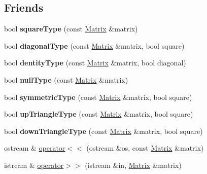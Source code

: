 \subsection*{Friends}
\begin{DoxyCompactItemize}
\item 
\hypertarget{class_matrix_ac308d2d0cd1651df117cd293f4a062ec}{bool {\bfseries square\-Type} (const \hyperlink{class_matrix}{Matrix} \&matrix)}\label{class_matrix_ac308d2d0cd1651df117cd293f4a062ec}

\item 
\hypertarget{class_matrix_a8f168d2d101b11060ff7665b718dbd00}{bool {\bfseries diagonal\-Type} (const \hyperlink{class_matrix}{Matrix} \&matrix, bool square)}\label{class_matrix_a8f168d2d101b11060ff7665b718dbd00}

\item 
\hypertarget{class_matrix_a0fe53702f523992357b0045647d86add}{bool {\bfseries dentity\-Type} (const \hyperlink{class_matrix}{Matrix} \&matrix, bool diagonal)}\label{class_matrix_a0fe53702f523992357b0045647d86add}

\item 
\hypertarget{class_matrix_ad324d8057612009e306716ff6f944d8d}{bool {\bfseries null\-Type} (const \hyperlink{class_matrix}{Matrix} \&matrix)}\label{class_matrix_ad324d8057612009e306716ff6f944d8d}

\item 
\hypertarget{class_matrix_a6952b686de4d766d5e6071ea05ce1e5e}{bool {\bfseries symmetric\-Type} (const \hyperlink{class_matrix}{Matrix} \&matrix, bool square)}\label{class_matrix_a6952b686de4d766d5e6071ea05ce1e5e}

\item 
\hypertarget{class_matrix_add887b389e9c6a532fd0de569ded15e1}{bool {\bfseries up\-Triangle\-Type} (const \hyperlink{class_matrix}{Matrix} \&matrix, bool square)}\label{class_matrix_add887b389e9c6a532fd0de569ded15e1}

\item 
\hypertarget{class_matrix_a9bca4cd9ce5dbee1a08831254b359093}{bool {\bfseries down\-Triangle\-Type} (const \hyperlink{class_matrix}{Matrix} \&matrix, bool square)}\label{class_matrix_a9bca4cd9ce5dbee1a08831254b359093}

\item 
ostream \& \hyperlink{class_matrix_a85a2865bcc2b7c641162bbd4aa13a7c6}{operator$<$$<$} (ostream \&os, const \hyperlink{class_matrix}{Matrix} \&matrix)
\item 
istream \& \hyperlink{class_matrix_a65e4cbf2651c384b15830e97747feebc}{operator$>$$>$} (istream \&in, \hyperlink{class_matrix}{Matrix} \&matrix)
\end{DoxyCompactItemize}


